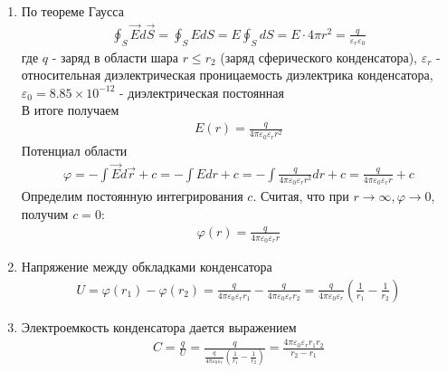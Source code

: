 \documentclass[__main__.tex]{subfiles}
\begin{document}
\begin{enumerate}
    \item По теореме Гаусса
          \begin{gather*}
              \oint_S\vec{E}d\vec{S} = \oint_SEdS = E\oint_SdS = E\cdot 4\pi r^2 = \frac{q}{\varepsilon_r \varepsilon_0}
          \end{gather*}
          где $q$ - заряд в области шара $r \leq r_2$ (заряд сферического конденсатора), $\varepsilon_r$ - относительная диэлектрическая проницаемость диэлектрика конденсатора, $\varepsilon_0 = 8.85\times 10^{-12}$ - диэлектрическая постоянная\\
          В итоге получаем
          \begin{gather*}
              E(r) = \frac{q}{4\pi \varepsilon_0 \varepsilon_r r^2}
          \end{gather*}
          Потенциал области
          \begin{gather*}
              \varphi = -\int\vec{E}d\vec{r}+c = -\int Edr +c = -\int \frac{q}{4\pi \varepsilon_0 \varepsilon_r r^2} dr +c = \frac{q}{4\pi \varepsilon_0 \varepsilon_r r}+c
          \end{gather*}
          Определим постоянную интегрирования $c$. Считая, что при $r\to\infty,\varphi\to 0$, получим $c = 0$:
          \begin{gather*}
              \varphi (r) = \frac{q}{4\pi \varepsilon_0 \varepsilon_r r}
          \end{gather*}
    \item Напряжение между обкладками конденсатора
          \begin{gather*}
              U = \varphi (r_1) - \varphi (r_2) = \frac{q}{4\pi \varepsilon_0 \varepsilon_r r_1} - \frac{q}{4\pi \varepsilon_0 \varepsilon_r r_2} = \frac{q}{4\pi \varepsilon_0 \varepsilon_r}\left(\frac{1}{r_1}-\frac{1}{r_2}\right)
          \end{gather*}
    \item Электроемкость конденсатора дается выражением
          \begin{gather*}
              C = \frac{q}{U} = \frac{q}{\frac{q}{4\pi \varepsilon_0 \varepsilon_r}\left(\frac{1}{r_1}-\frac{1}{r_2}\right)} = \frac{4\pi \varepsilon_0 \varepsilon_r r_1 r_2}{r_2-r_1}
          \end{gather*}
\end{enumerate}
\end{document}
